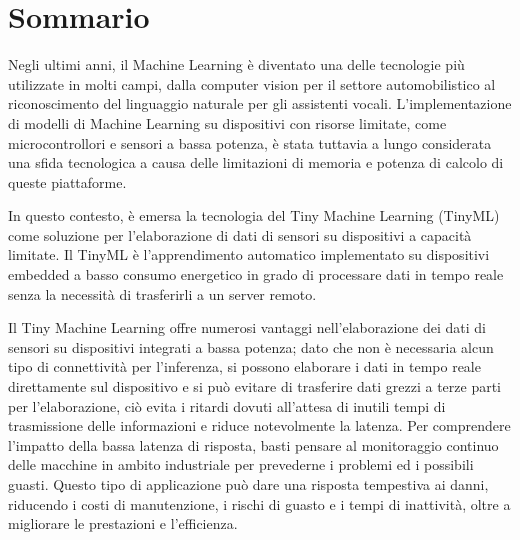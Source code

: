 \chapter*{Sommario} %
\label{sommario}




Negli ultimi anni, il Machine Learning è diventato una delle tecnologie più utilizzate in molti campi, dalla computer vision per il settore automobilistico al riconoscimento del linguaggio naturale per gli assistenti vocali. L'implementazione di modelli di Machine Learning su dispositivi con risorse limitate, come microcontrollori e sensori a bassa potenza, è stata tuttavia a lungo considerata una sfida tecnologica a causa delle limitazioni di memoria e potenza di calcolo di queste piattaforme.

In questo contesto, è emersa la tecnologia del Tiny Machine Learning (TinyML) come soluzione per l'elaborazione di dati di sensori su dispositivi a capacità limitate. Il TinyML è l'apprendimento automatico implementato su dispositivi embedded a basso consumo energetico in grado di processare dati in tempo reale senza la necessità di trasferirli a un server remoto.


Il Tiny Machine Learning offre numerosi vantaggi nell'elaborazione dei dati di sensori su dispositivi integrati a bassa potenza; dato che non è necessaria alcun tipo di connettività per l'inferenza, si possono elaborare i dati in tempo reale direttamente sul dispositivo e si può evitare di trasferire dati grezzi a terze parti per l'elaborazione, ciò evita i ritardi dovuti all'attesa di inutili tempi di trasmissione delle informazioni e riduce notevolmente la latenza. Per comprendere l'impatto della bassa latenza di risposta, basti pensare al monitoraggio continuo delle macchine in ambito industriale per prevederne i problemi ed i possibili guasti. Questo tipo di applicazione può dare una risposta tempestiva ai danni, riducendo i costi di manutenzione, i rischi di guasto e i tempi di inattività, oltre a migliorare le prestazioni e l'efficienza. 

